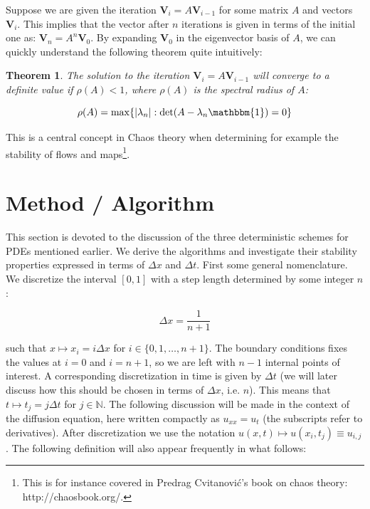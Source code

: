 \documentclass[a4paper, 11pt, notitlepage,english]{article}
\newcommand{\id}{\mathbbm{1}}
\newtheorem{theorem}{Theorem}
\begin{document}
Suppose we are given the iteration $\boldsymbol{V}_i = A \boldsymbol{V}_{i-1}$ for some matrix $A$ and vectors $\boldsymbol{V}_i$. This implies that the vector after $n$ iterations is given in terms of the initial one as: $\boldsymbol{V}_n = A^n \boldsymbol{V}_0$. By expanding $\boldsymbol{V}_0$ in the eigenvector basis of $A$, we can quickly understand the following theorem quite intuitively: \\

\begin{theorem}
The solution to the iteration $\boldsymbol{V}_i = A \boldsymbol{V}_{i-1}$ will converge to a definite value if $\rho(A) < 1$, where $\rho(A)$ is the spectral radius of $A$:

\begin{equation}
\rho(A) = \mathrm{max}\{\lvert \lambda_n \rvert : \mathrm{det}(A-\lambda_n\id)=0 \}
\label{eq:Spectral_radius}
\end{equation}
\end{theorem}

This is a central concept in Chaos theory when determining for example the stability of flows and maps\footnote{This is for instance covered in Predrag Cvitanović's book on chaos theory: http://chaosbook.org/.}.

\section{Method / Algorithm}
This section is devoted to the discussion of the three deterministic schemes for PDEs mentioned earlier. We derive the algorithms and investigate their stability properties expressed in terms of $\Delta x$ and $\Delta t$. First some general nomenclature. We discretize the interval $[0,1]$ with a step length determined by some integer $n$: 

\begin{equation}
 \Delta x = \frac{1}{n+1}
\label{eq:Step_length}
\end{equation}

such that $x \mapsto x_i = i\Delta x$ for $i \in \{0,1,\dots,n+1 \}$. The boundary conditions fixes the values at $i=0$ and $i=n+1$, so we are left with $n-1$ internal points of interest. A corresponding discretization in time is given by $\Delta t$ (we will later discuss how this should be chosen in terms of $\Delta x$, i.e. $n$). This means that $t\mapsto t_j = j\Delta t$ for $j\in \mathbb{N}$. The following discussion will be made in the context of the diffusion equation, here written compactly as $u_{xx} = u_t$ (the subscripts refer to derivatives). After discretization we use the notation $u(x,t) \mapsto u(x_i, t_j) \equiv u_{i,j}$. The following definition will also appear frequently in what follows:
\end{document}
